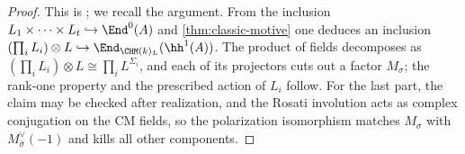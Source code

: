 \begin{proof}
  This is \cite[Corollary 3.2]{Ascona}; we recall the argument. From the
  inclusion \(L_1 \times \cdots \times L_t \hookrightarrow \End^0(A)\) and
  \cref{thm:classic-motive} one deduces an inclusion
  \((\prod_i L_i) \otimes L \hookrightarrow \End_{\CHM(k)_{L}}(\hh^1(A))\). The
  product of fields decomposes as
  \((\prod_i L_i) \otimes L \cong \prod_i L^{\Sigma_i}\), and each of its
  projectors cuts out a factor \(M_\sigma\); the rank-one property and the
  prescribed action of \(L_i\) follow. For the last part, the claim may be
  checked after realization, and the Rosati involution acts as complex
  conjugation on the CM fields, so the polarization isomorphism matches
  \(M_\sigma\) with \(M_{\bar\sigma}^\vee(-1)\) and kills all other components.
\end{proof}

